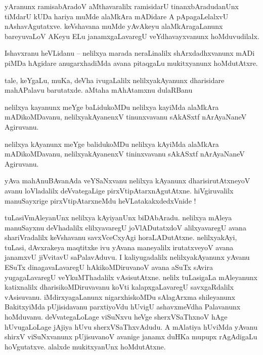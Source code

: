\documentclass{article}
\begin{document}
\begin{mn}%
yAranunx ramisabAradoV aMthavaralilx ramisidarU tinanxbAradudanUnx tiMdarU kUDa hariya muMde 
alaMkAra mADidare A pApagaLelalxvU nAshavAgutatxve. keVshavana muMde yAvAkeyu alaMkAragaLanunx 
bareyuvaLoV AKeyu ELu janamxgaLavaregU veYdhavayxvanunx hoMduvudilalx.
\end{mn}


\begin{mn}%
Ishavxranu heVLidanu -- nelilxya marada neraLinalilx shArxdadhxvanunx mADi piMDa hAgidare 
anugarxhadiMda avana pitaqgaLu mukitxyanunx hoMdutAtxre.
\end{mn}

\begin{mn}%
tale, keYgaLu, muKa, deVha ivugaLalilx nelilxyakAyanunx dharisidare mahAPalavu barutatxde. aMtaha 
mAhAtamxnu dulaRBanu
\end{mn}

\begin{mn}%
nelilxya kayanunx meYge baLidukoMDu nelilxya kayiMda alaMkAra mADikoMDavanu, nelilxyakAyanenxV 
tinunxvavanu sAkASxtf nArAyaNaneV Agiruvanu.
\end{mn}

\begin{mn}%
nelilxya kAyanunx meYge balidukoMDu nelilxya kAyiMda alaMkAra mADikoMDavanu, nelilxyakAyanenxV 
tininxvavanu sAkASxtf nArAyaNaneV Agiruvanu.
\end{mn}

\begin{mn}%
yAva mahAnuBAvanAda veYSaNxvanu nelilxya kAyanunx dharisirutAtxneyoV avanu loVladalilx 
deVvategaLige pirxVtipAtarxnAgutAtxne. hiVgiruvalilx manuSayxrige pirxVtipAtarxneMdu 
heVLatakakxdedxVnide !
\end{mn}

\begin{mn}%
tuLasiVmAleyanUnx nelilxya kAyiyanUnx biDAbAradu. nelilxya mAleya manuSayxnu deVhadalilx 
elilxyavaregU joVlADutatxdoV alilxyavaregU avana shariVradalilx keVshavanu savxVceCxyAgi 
horaLADutAtxne. nelilxyakAyi, tuLasi, dAvxrakeya maqtitxke ivu yAvana maneyalilx irutatxveyoV 
avana janamxvU jiVvitavU saPalavAduvu. I kaliyugadalilx nelilxyakAyanunx yAvanu ESuTx 
dinagavaLavaregU hAkikoMDiruvanoV avana aSuTx sAvira yugagaLavaregU veYkuMThadalilx vAsisutAtxne. 
nelilx tuLasigaLa mAleyanunx katixnalilx dharisikoMDiruvavanu koVti kalapxgaLavaregU 
savxgaRdalilx vAsisuvanu. iMdirxyagaLanunx nigarxhiskoMDu sAlagArxma shileyanunx BakitxyiMda 
pUjisidavanu parxtiyoVdu hUvigU ashavxmeVdha Palavanunx hoMduvanu. deVvategaLoLage viSuNxvu heVge 
sherxVSaThxnoV hAge hUvugaLoLage jAjiya hUvu sherxVSaThxvAdudu. A mAlatiya hUviMda yAvanu shirxV 
viSuNxvanunx pUjisuvanoV avanige janamx duHKa mupupx rAgAdigaLu hoVgutatxve. alalxde mukitxyanUnx 
hoMdutAtxne.
\end{mn}
\end{document}
